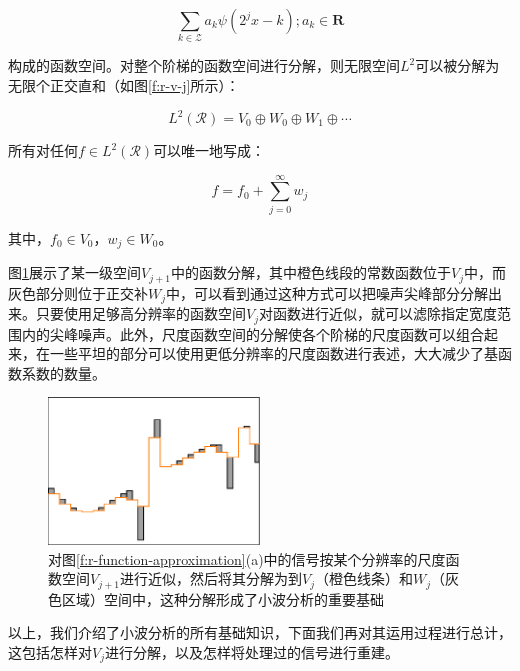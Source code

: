 \begin{equation}
	\sum_{k\in\mathcal{Z}}a_k\psi(2^{j}x-k);a_k\in\mathbf{R}
\end{equation}

\noindent 构成的函数空间。对整个阶梯的函数空间进行分解，则无限空间$L^{2}$可以被分解为无限个正交直和（如图\ref{f:r-v-j}所示）：

\begin{equation}\label{e:r-wavelet-decompose-1}
	L^{2}(\mathcal{R})=V_0\oplus W_0\oplus W_1\oplus\cdots
\end{equation}

\noindent 所有对任何$f\in L^{2}(\mathcal{R})$可以唯一地写成：

\begin{equation}\label{e:r-wavelet-decompose-2}
	f=f_0+\sum^{\infty}_{j=0}w_j
\end{equation}

\noindent 其中，$f_0\in V_0$，$w_j\in W_0$。

图\ref{f:r-decompose}展示了某一级空间$V_{j+1}$中的函数分解，其中橙色线段的常数函数位于$V_j$中，而灰色部分则位于正交补$W_j$中，可以看到通过这种方式可以把噪声尖峰部分分解出来。只要使用足够高分辨率的函数空间$V_j$对函数进行近似，就可以滤除指定宽度范围内的尖峰噪声。此外，尺度函数空间的分解使各个阶梯的尺度函数可以组合起来，在一些平坦的部分可以使用更低分辨率的尺度函数进行表述，大大减少了基函数系数的数量。

\begin{figure}
	\sidecaption
	\includegraphics[width=0.5\textwidth]{figures/r/decompose}
	\caption{对图\ref{f:r-function-approximation}(a)中的信号按某个分辨率的尺度函数空间$V_{j+1}$进行近似，然后将其分解为到$V_j$（橙色线条）和$W_j$（灰色区域）空间中，这种分解形成了小波分析的重要基础}
	\label{f:r-decompose}
\end{figure}

以上，我们介绍了小波分析的所有基础知识，下面我们再对其运用过程进行总计，这包括怎样对$V_j$进行分解，以及怎样将处理过的信号进行重建。





